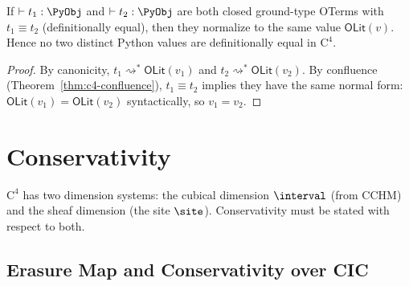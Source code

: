 \begin{corollary}
\label{cor:no-spurious}
If $\vdash t_1 : \PyObj$ and $\vdash t_2 : \PyObj$ are both closed
ground-type OTerms with $t_1 \equiv t_2$ (definitionally equal), then
they normalize to the same value $\mathsf{OLit}(v)$.  Hence no two
distinct Python values are definitionally equal in $\mathrm{C}^4$.
\end{corollary}

\begin{proof}
By canonicity, $t_1 \rightsquigarrow^* \mathsf{OLit}(v_1)$ and
$t_2 \rightsquigarrow^* \mathsf{OLit}(v_2)$.  By confluence
(Theorem~\ref{thm:c4-confluence}), $t_1 \equiv t_2$ implies they
have the same normal form: $\mathsf{OLit}(v_1) = \mathsf{OLit}(v_2)$
syntactically, so $v_1 = v_2$.
\end{proof}


\section{Conservativity}
\label{sec:conservativity}

$\mathrm{C}^4$ has two dimension systems: the cubical dimension
$\interval$ (from CCHM) and the sheaf dimension (the site $\site$).
Conservativity must be stated with respect to both.

\subsection{Erasure Map and Conservativity over CIC}
\label{sec:conservativity-cic}

